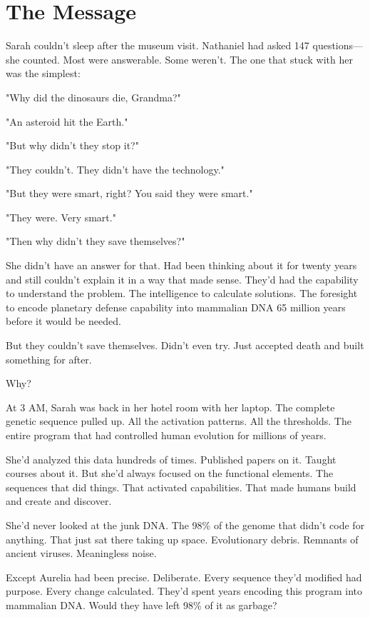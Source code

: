 \chapter{The Message}
\label{ch:31}


Sarah couldn't sleep after the museum visit. Nathaniel had asked 147 questions—she counted. Most were answerable. Some weren't. The one that stuck with her was the simplest:

"Why did the dinosaurs die, Grandma?"

"An asteroid hit the Earth."

"But why didn't they stop it?"

"They couldn't. They didn't have the technology."

"But they were smart, right? You said they were smart."

"They were. Very smart."

"Then why didn't they save themselves?"

She didn't have an answer for that. Had been thinking about it for twenty years and still couldn't explain it in a way that made sense. They'd had the capability to understand the problem. The intelligence to calculate solutions. The foresight to encode planetary defense capability into mammalian DNA 65 million years before it would be needed.

But they couldn't save themselves. Didn't even try. Just accepted death and built something for after.

Why?

At 3 AM, Sarah was back in her hotel room with her laptop. The complete genetic sequence pulled up. All the activation patterns. All the thresholds. The entire program that had controlled human evolution for millions of years.

She'd analyzed this data hundreds of times. Published papers on it. Taught courses about it. But she'd always focused on the functional elements. The sequences that did things. That activated capabilities. That made humans build and create and discover.

She'd never looked at the junk DNA. The 98\% of the genome that didn't code for anything. That just sat there taking up space. Evolutionary debris. Remnants of ancient viruses. Meaningless noise.

Except Aurelia had been precise. Deliberate. Every sequence they'd modified had purpose. Every change calculated. They'd spent years encoding this program into mammalian DNA. Would they have left 98\% of it as garbage?

